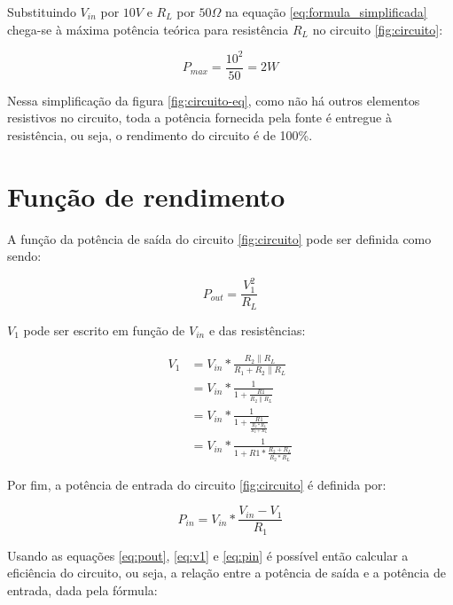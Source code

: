 \documentclass[12pt]{article}
\begin{document}
Substituindo $V_{in}$ por $10V$ e $R_L$ por $50\Omega$ na equação \ref{eq:formula_simplificada} chega-se à máxima potência teórica para  resistência $R_L$ no circuito \ref{fig:circuito}:

\begin{equation}
    \label{eq:potencia_teorica}
    P_{max} = \frac{10^2}{50} = 2W
\end{equation}

Nessa simplificação da figura \ref{fig:circuito-eq}, como não há outros elementos resistivos no circuito, toda a potência fornecida pela fonte é entregue à resistência, ou seja, o rendimento do circuito é de 100\%.

\section{Função de rendimento}
\label{cap:equacionament}

A função da potência de saída do circuito \ref{fig:circuito} pode ser definida como sendo:

\begin{equation}
    \label{eq:pout}
    P_{out} = \frac{V_1^2}{R_L}
\end{equation}

$V_1$ pode ser escrito em função de $V_{in}$ e das resistências:

\begin{equation}
    \label{eq:v1}
    \begin{split}
        V_1 & = V_{in} * \frac{R_2\parallel R_L}{R_1 + R_2\parallel R_L} \\
        & = V_{in} * \frac{1}{1 + \frac{R1}{R_2\parallel R_L}} \\
        & = V_{in} * \frac{1}{1 + \frac{R1}{\frac{R_2 * R_L}{R_2 + R_L} }} \\
        & = V_{in} * \frac{1}{1 + R1 * \frac{R_2 + R_L}{R_2 * R_L} }
    \end{split}
\end{equation}

Por fim, a potência de entrada do circuito \ref{fig:circuito} é definida por:

\begin{equation}
    \label{eq:pin}
    P_{in} = V_{in} * \frac{V_{in} - V_1}{R_1}
\end{equation}

Usando as equações \ref{eq:pout}, \ref{eq:v1} e \ref{eq:pin} é possível então calcular a eficiência do circuito, ou seja, a relação entre a potência de saída e a potência de entrada, dada pela fórmula:
\end{document}
